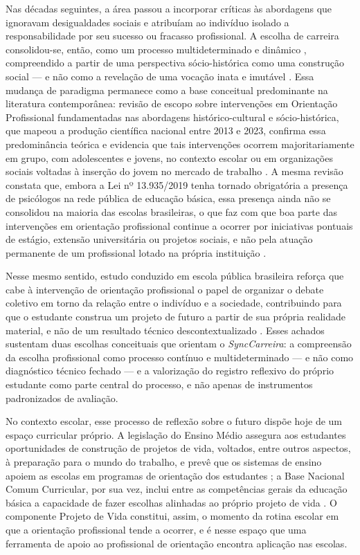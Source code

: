 Nas décadas seguintes, a área passou a incorporar críticas às abordagens que ignoravam desigualdades sociais e atribuíam ao indivíduo isolado a responsabilidade por seu sucesso ou fracasso profissional. A escolha de carreira consolidou-se, então, como um processo multideterminado e dinâmico \cite{abade2005}, compreendido a partir de uma perspectiva sócio-histórica como uma construção social --- e não como a revelação de uma vocação inata e imutável \cite{bock2004}. Essa mudança de paradigma permanece como a base conceitual predominante na literatura contemporânea: revisão de escopo sobre intervenções em Orientação Profissional fundamentadas nas abordagens histórico-cultural e sócio-histórica, que mapeou a produção científica nacional entre 2013 e 2023, confirma essa predominância teórica e evidencia que tais intervenções ocorrem majoritariamente em grupo, com adolescentes e jovens, no contexto escolar ou em organizações sociais voltadas à inserção do jovem no mercado de trabalho \cite{martins2024}. A mesma revisão constata que, embora a Lei nº 13.935/2019 tenha tornado obrigatória a presença de psicólogos na rede pública de educação básica, essa presença ainda não se consolidou na maioria das escolas brasileiras, o que faz com que boa parte das intervenções em orientação profissional continue a ocorrer por iniciativas pontuais de estágio, extensão universitária ou projetos sociais, e não pela atuação permanente de um profissional lotado na própria instituição \cite{martins2024}.

Nesse mesmo sentido, estudo conduzido em escola pública brasileira reforça que cabe à intervenção de orientação profissional o papel de organizar o debate coletivo em torno da relação entre o indivíduo e a sociedade, contribuindo para que o estudante construa um projeto de futuro a partir de sua própria realidade material, e não de um resultado técnico descontextualizado \cite{gomes2020}. Esses achados sustentam duas escolhas conceituais que orientam o \textit{SyncCarreira}: a compreensão da escolha profissional como processo contínuo e multideterminado --- e não como diagnóstico técnico fechado --- e a valorização do registro reflexivo do próprio estudante como parte central do processo, e não apenas de instrumentos padronizados de avaliação.

No contexto escolar, esse processo de reflexão sobre o futuro dispõe hoje de um espaço curricular próprio. A legislação do Ensino Médio assegura aos estudantes oportunidades de construção de projetos de vida, voltados, entre outros aspectos, à preparação para o mundo do trabalho, e prevê que os sistemas de ensino apoiem as escolas em programas de orientação dos estudantes \cite{brasil2024lei14945}; a Base Nacional Comum Curricular, por sua vez, inclui entre as competências gerais da educação básica a capacidade de fazer escolhas alinhadas ao próprio projeto de vida \cite{brasil2018bncc}. O componente Projeto de Vida constitui, assim, o momento da rotina escolar em que a orientação profissional tende a ocorrer, e é nesse espaço que uma ferramenta de apoio ao profissional de orientação encontra aplicação nas escolas.

